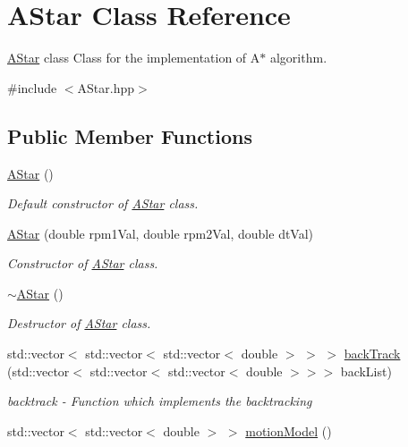 \hypertarget{class_a_star}{}\section{A\+Star Class Reference}
\label{class_a_star}


\hyperlink{class_a_star}{A\+Star} class Class for the implementation of A$\ast$ algorithm.  




{\ttfamily \#include $<$A\+Star.\+hpp$>$}

\subsection*{Public Member Functions}
\begin{DoxyCompactItemize}
\item 
\hyperlink{class_a_star_ab7cfaf9e1662f45f5fdce245d28c4508}{A\+Star} ()
\begin{DoxyCompactList}\small\item\em Default constructor of \hyperlink{class_a_star}{A\+Star} class. \end{DoxyCompactList}\item 
\hyperlink{class_a_star_ab105ea1d89edefbd8723b0f36652f1aa}{A\+Star} (double rpm1\+Val, double rpm2\+Val, double dt\+Val)
\begin{DoxyCompactList}\small\item\em Constructor of \hyperlink{class_a_star}{A\+Star} class. \end{DoxyCompactList}\item 
\hyperlink{class_a_star_ad246668465621db8818bbe3511fa4ae7}{$\sim$\+A\+Star} ()
\begin{DoxyCompactList}\small\item\em Destructor of \hyperlink{class_a_star}{A\+Star} class. \end{DoxyCompactList}\item 
std\+::vector$<$ std\+::vector$<$ std\+::vector$<$ double $>$ $>$ $>$ \hyperlink{class_a_star_a8fce98f22c2687fa0a214faf9090329c}{back\+Track} (std\+::vector$<$ std\+::vector$<$ std\+::vector$<$ double $>$$>$$>$ back\+List)
\begin{DoxyCompactList}\small\item\em backtrack -\/ Function which implements the backtracking \end{DoxyCompactList}\item 
std\+::vector$<$ std\+::vector$<$ double $>$ $>$ \hyperlink{class_a_star_a6c0e58da70d0dd3402d2fd4e4e3feeec}{motion\+Model} ()

\end{DoxyCompactItemize}
